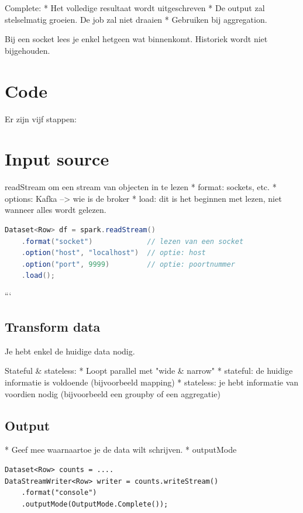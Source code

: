 \documentclass[a4paper,10pt,twoside]{report}
\begin{document}
Complete:
* Het volledige resultaat wordt uitgeschreven
* De output zal stelselmatig groeien. De job zal niet draaien
* Gebruiken bij aggregation.

Bij een socket lees je enkel hetgeen wat binnenkomt. Historiek wordt niet bijgehouden.

\section{Code}

Er zijn vijf stappen:

\section{Input source}

readStream om een stream van objecten in te lezen
* format: sockets, etc.
* options: Kafka --> wie is de broker
* load: dit is het beginnen met lezen, niet wanneer alles wordt gelezen.

\begin{lstlisting}[language=Java]
Dataset<Row> df = spark.readStream()
	.format("socket")             // lezen van een socket
	.option("host", "localhost")  // optie: host
	.option("port", 9999)         // optie: poortnummer
	.load();
\end{lstlisting}

```

\subsection{Transform data}

Je hebt enkel de huidige data nodig.

Stateful \& stateless:
* Loopt parallel met "wide \& narrow"
* stateful: de huidige informatie is voldoende (bijvoorbeeld mapping)
* stateless: je hebt informatie van voordien nodig (bijvoorbeeld een groupby of een aggregatie)

\subsection{Output}

* Geef mee waarnaartoe je de data wilt schrijven.
* outputMode

\begin{lstlisting}
Dataset<Row> counts = ....
DataStreamWriter<Row> writer = counts.writeStream()
	.format("console")
	.outputMode(OutputMode.Complete());
\end{lstlisting}
\end{document}
